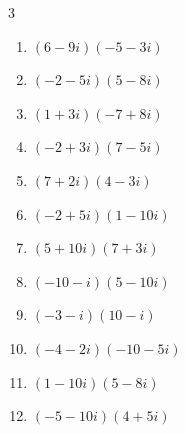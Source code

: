 \begin{multicols}{3}
\begin{enumerate}
        \phantom{$\displaystyle =19+43i$}

  \item $\displaystyle (6-9i)(-5-3i)$

        \phantom{$\displaystyle =-57+27i$}

  \item $\displaystyle (-2-5i)(5-8i)$

        \phantom{$\displaystyle =-50-9i$}

  \item $\displaystyle (1+3i)(-7+8i)$

        \phantom{$\displaystyle =-31-13i$}

  \item $\displaystyle (-2+3i)(7-5i)$

        \phantom{$\displaystyle =1+31i$}

  \item $\displaystyle (7+2i)(4-3i)$

        \phantom{$\displaystyle =34-13i$}

\columnbreak %

\resetques

  \item $\displaystyle (-2+5i)(1-10i)$

        \phantom{$\displaystyle =48+25i$}

  \item $\displaystyle (5+10i)(7+3i)$

        \phantom{$\displaystyle =5+85i$}

  \item $\displaystyle (-10-i)(5-10i)$

        \phantom{$\displaystyle =-60+95i$}

  \item $\displaystyle (-3-i)(10-i)$

        \phantom{$\displaystyle =-31-7i$}

  \item $\displaystyle (-4-2i)(-10-5i)$

        \phantom{$\displaystyle =30+40i$}

  \item $\displaystyle (1-10i)(5-8i)$

        \phantom{$\displaystyle =-75-58i$}

  \item $\displaystyle (-5-10i)(4+5i)$

        \phantom{$\displaystyle =30-65i$}


\end{enumerate}
\end{multicols}

